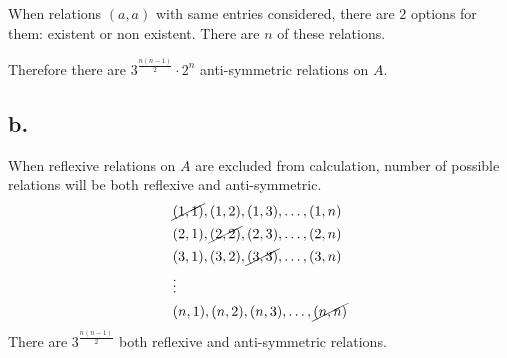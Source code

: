 \documentclass[12pt]{article}
\begin{document}
When relations $(a,a)$ with same entries considered, there are $2$ options for them: existent or non existent. There are $n$ of these relations.

Therefore there are $3^{\frac{n(n-1)}{2}}\cdot2^n$ anti-symmetric relations on $A$.

\subsection*{b.}
When reflexive relations on $A$ are excluded from calculation, number of possible relations will be both reflexive and anti-symmetric.
\begin{align*}
    &\cancel{(1,1)}, (1,2), (1,3), \dots, (1,n)  \\
    &(2,1), \cancel{(2,2)}, (2,3), \dots, (2,n)  \\
    &(3,1), (3,2), \cancel{(3,3)}, \dots, (3,n) \\
    &\vdots \\
    &(n,1), (n,2), (n,3), \dots, \cancel{(n,n)} \\
\end{align*}
There are $3^{\frac{n(n-1)}{2}}$ both reflexive and anti-symmetric relations.
\end{document}
